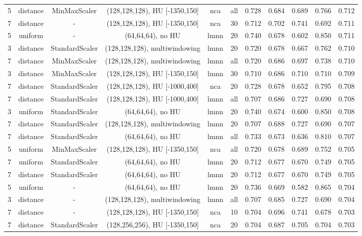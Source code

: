 \begin{sidewaystable}[!htbp]
{\begin{tabular}{ccccccccccc}
5 & distance & MinMaxScaler & (128,128,128), HU [-1350,150] & nca & all & 0.728 & 0.684 & 0.689 & 0.766 & 0.712 \\
7 & distance & - & (128,128,128), HU [-1350,150] & nca & 30 & 0.712 & 0.702 & 0.741 & 0.692 & 0.711 \\
5 & uniform & - & (64,64,64), no HU & lmnn & 20 & 0.740 & 0.678 & 0.602 & 0.850 & 0.711 \\
3 & distance & StandardScaler & (128,128,128), multiwindowing & lmnn & 20 & 0.720 & 0.678 & 0.667 & 0.762 & 0.710 \\
7 & distance & MinMaxScaler & (128,128,128), multiwindowing & lmnn & all & 0.720 & 0.686 & 0.697 & 0.738 & 0.710 \\
3 & distance & MinMaxScaler & (128,128,128), HU [-1350,150] & lmnn & 30 & 0.710 & 0.686 & 0.710 & 0.710 & 0.709 \\
7 & distance & StandardScaler & (128,128,128), HU [-1000,400] & nca & 20 & 0.728 & 0.678 & 0.652 & 0.795 & 0.708 \\
7 & distance & StandardScaler & (128,128,128), HU [-1000,400] & lmnn & all & 0.707 & 0.686 & 0.727 & 0.690 & 0.708 \\
3 & uniform & StandardScaler & (64,64,64), no HU & lmnn & 20 & 0.740 & 0.674 & 0.600 & 0.850 & 0.708 \\
7 & distance & StandardScaler & (128,128,128), multiwindowing & lmnn & 20 & 0.707 & 0.688 & 0.727 & 0.690 & 0.707 \\
7 & distance & StandardScaler & (64,64,64), no HU & lmnn & all & 0.733 & 0.673 & 0.636 & 0.810 & 0.707 \\
5 & uniform & MinMaxScaler & (128,128,128), HU [-1350,150] & nca & all & 0.720 & 0.678 & 0.689 & 0.752 & 0.705 \\
7 & uniform & StandardScaler & (64,64,64), no HU & lmnn & 20 & 0.712 & 0.677 & 0.670 & 0.749 & 0.705 \\
7 & distance & StandardScaler & (64,64,64), no HU & lmnn & 20 & 0.712 & 0.677 & 0.670 & 0.749 & 0.705 \\
5 & uniform & - & (64,64,64), no HU & lmnn & 20 & 0.736 & 0.669 & 0.582 & 0.865 & 0.704 \\
3 & distance & - & (128,128,128), multiwindowing & lmnn & all & 0.707 & 0.685 & 0.727 & 0.690 & 0.704 \\
7 & distance & - & (128,128,128), HU [-1350,150] & nca & 10 & 0.704 & 0.696 & 0.741 & 0.678 & 0.703 \\
7 & distance & StandardScaler & (128,256,256), HU [-1350,150] & nca & 20 & 0.704 & 0.687 & 0.705 & 0.704 & 0.703 \\

\end{tabular}}
\end{sidewaystable}
